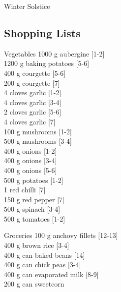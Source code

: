 \begin{menu}{Winter Solstice}
    \subsection*{Shopping Lists}
      \begin{shoppinglist}{Vegetables}
      1000 g aubergine 
        {\scriptsize[1-2]}\\
      1200 g baking potatoes 
        {\scriptsize[5-6]}\\
      400 g courgette 
        {\scriptsize[5-6]}\\
      200 g courgette 
        {\scriptsize[7]}\\
      4 cloves garlic 
        {\scriptsize[1-2]}\\
      4 cloves garlic 
        {\scriptsize[3-4]}\\
      2 cloves garlic 
        {\scriptsize[5-6]}\\
      4 cloves garlic 
        {\scriptsize[7]}\\
      100 g mushrooms 
        {\scriptsize[1-2]}\\
      500 g mushrooms 
        {\scriptsize[3-4]}\\
      400 g onions 
        {\scriptsize[1-2]}\\
      400 g onions 
        {\scriptsize[3-4]}\\
      400 g onions 
        {\scriptsize[5-6]}\\
      500 g potatoes 
        {\scriptsize[1-2]}\\
      1  red chilli 
        {\scriptsize[7]}\\
      150 g red pepper 
        {\scriptsize[7]}\\
      500 g spinach 
        {\scriptsize[3-4]}\\
      500 g tomatoes 
        {\scriptsize[1-2]}\\
      \end{shoppinglist}%
      \begin{shoppinglist}{Groceries}
      100 g anchovy fillets 
        {\scriptsize[12-13]}\\
      400 g brown rice 
        {\scriptsize[3-4]}\\
      400 g can baked beans 
        {\scriptsize[14]}\\
      400 g can chick peas 
        {\scriptsize[3-4]}\\
      400 g can evaporated milk 
        {\scriptsize[8-9]}\\
      200 g can sweetcorn 

\end{shoppinglist}
\end{menu}

